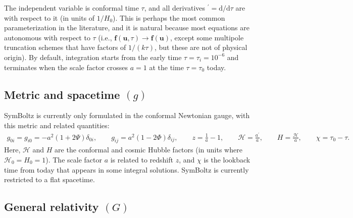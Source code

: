 \documentclass{aa}
\newcommand\scrH{\mathscr{H}}
\begin{document}
The independent variable is conformal time $\tau$, and all derivatives ${}^\prime = \mathrm{d} / \mathrm{d}\tau$ are with respect to it (in units of $1/H_0$).
This is perhaps the most common parameterization in the literature, and it is natural because most equations are autonomous with respect to $\tau$ (i.e., $\boldsymbol{f}(\boldsymbol{u},\tau) \rightarrow \boldsymbol{f}(\boldsymbol{u})$, except some multipole truncation schemes that have factors of $1/(k\tau)$, but these are not of physical origin).
By default, integration starts from the early time $\tau = \tau_i = 10^{-6}$ and terminates when the scale factor crosses $a = 1$ at the time $\tau = \tau_0$ today.

\subsection{Metric and spacetime \texorpdfstring{$(g)$}{(g)}}
\label{sec:metric}
SymBoltz is currently only formulated in the conformal Newtonian gauge, with this metric and related quantities:
\begin{align*}
    g_{0i} = g_{i0} = -a^2 (1+2\Psi) \delta_{0i}, \qquad
    g_{ij} = a^2 (1-2\Phi) \delta_{ij}, \qquad
    z = \frac{1}{a} - 1, \qquad
    \scrH = \frac{a^\prime}{a}, \qquad
    H = \frac{\scrH}{a} , \qquad
    \chi = \tau_0 - \tau .
\end{align*}
Here, $\scrH$ and $H$ are the conformal and cosmic Hubble factors (in units where $\scrH_0 = H_0 = 1$).
The scale factor $a$ is related to redshift $z$, and $\chi$ is the lookback time from today that appears in some integral solutions.
SymBoltz is currently restricted to a flat spacetime.

\subsection{General relativity \texorpdfstring{$(G)$}{(G)}}
\label{sec:gravity}
\end{document}
